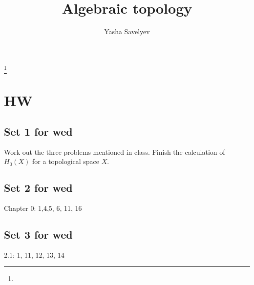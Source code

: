 \documentclass{amsart}
\numberwithin{equation}{section}
\theoremstyle{definition}
\theoremstyle{remark}
\begin{document}
\title{Algebraic topology}
\author{Yasha Savelyev}
\thanks {}
\address{University of Colima, CUICBAS}
\keywords{}
\maketitle
\section{HW}
\subsection{Set 1 for wed} \label{sec_Set 1 for wed} 
Work out the three problems mentioned in class. Finish the
calculation of $H _{0} (X) $ for a topological space $X$. 
\subsection{Set 2 for wed}
Chapter 0: 1,4,5, 6, 11, 16 
\subsection{Set 3 for wed}
2.1: 1, 11, 12, 13, 14 

% 
% 
\end{document}
